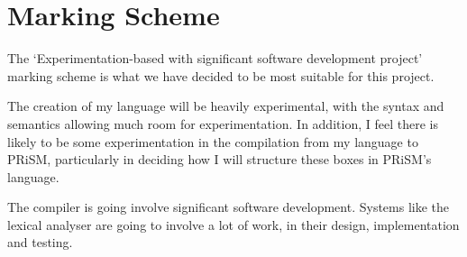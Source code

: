 \documentclass[11pt, a4paper]{article}
\begin{document}

\section{Marking Scheme} %
\label{sec:marking_scheme}
The `Experimentation-based with significant software development project'
marking scheme is what we have decided to be most suitable for this project.

The creation of my language will be heavily experimental, with the syntax and
semantics allowing much room for experimentation. In addition, I feel there is
likely to be some experimentation in the compilation from my language to PRiSM,
particularly in deciding how I will structure these boxes in PRiSM's language.

The compiler is going involve significant software development. Systems like the
lexical analyser are going to involve a lot of work, in their design,
implementation and testing. 

\newpage
\printbibliography
\end{document}
